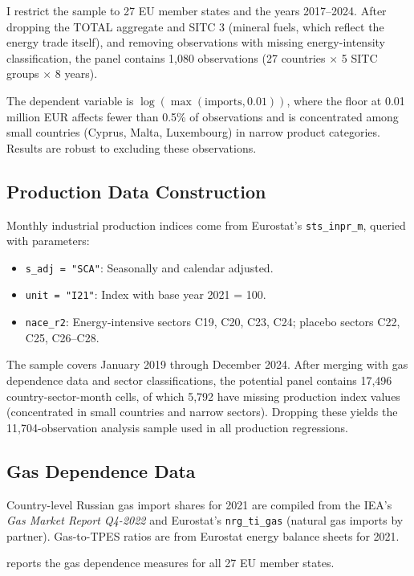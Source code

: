 \documentclass[12pt]{article}
\begin{document}
I restrict the sample to 27 EU member states and the years 2017--2024. After dropping the TOTAL aggregate and SITC 3 (mineral fuels, which reflect the energy trade itself), and removing observations with missing energy-intensity classification, the panel contains 1,080 observations (27 countries $\times$ 5 SITC groups $\times$ 8 years).

The dependent variable is $\log(\max(\text{imports}, 0.01))$, where the floor at 0.01 million EUR affects fewer than 0.5\% of observations and is concentrated among small countries (Cyprus, Malta, Luxembourg) in narrow product categories. Results are robust to excluding these observations.

\subsection{Production Data Construction}

Monthly industrial production indices come from Eurostat's \texttt{sts\_inpr\_m}, queried with parameters:
\begin{itemize}
\item \texttt{s\_adj = "SCA"}: Seasonally and calendar adjusted.
\item \texttt{unit = "I21"}: Index with base year 2021 = 100.
\item \texttt{nace\_r2}: Energy-intensive sectors C19, C20, C23, C24; placebo sectors C22, C25, C26--C28.
\end{itemize}

The sample covers January 2019 through December 2024. After merging with gas dependence data and sector classifications, the potential panel contains 17,496 country-sector-month cells, of which 5,792 have missing production index values (concentrated in small countries and narrow sectors). Dropping these yields the 11,704-observation analysis sample used in all production regressions.

\subsection{Gas Dependence Data}

Country-level Russian gas import shares for 2021 are compiled from the IEA's \textit{Gas Market Report Q4-2022} \citep{iea2022} and Eurostat's \texttt{nrg\_ti\_gas} (natural gas imports by partner). Gas-to-TPES ratios are from Eurostat energy balance sheets for 2021.

 reports the gas dependence measures for all 27 EU member states.
\end{document}
